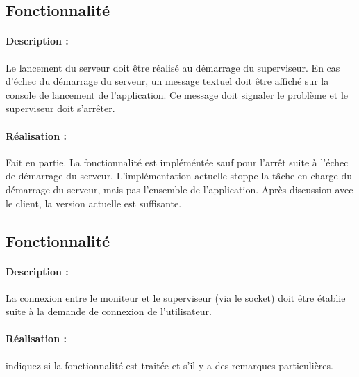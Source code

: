 \documentclass[11pt, a4paper]{paper}
\newcounter{cptreq}
\begin{document}
{\color{gray}
\subsection{Fonctionnalité \thecptreq *}

\paragraph{Description :} Le lancement du serveur doit être réalisé au démarrage du superviseur. En cas d'échec du démarrage du serveur, un message textuel doit être  affiché sur la console de lancement de l'application. Ce message doit signaler le problème et le superviseur doit s'arrêter.

\paragraph{\color{black}Réalisation :}  {\color{blue} Fait en partie. La fonctionnalité est impléméntée sauf pour l'arrêt suite à l'échec de démarrage du serveur. L'implémentation actuelle stoppe la tâche en charge du démarrage du serveur, mais pas l'ensemble de l'application. Après discussion avec le client, la version actuelle est suffisante.}
}
{\color{gray}
\subsection{Fonctionnalité \thecptreq *}

\paragraph{Description :} La connexion entre le moniteur et le superviseur (via le socket) doit être établie suite à la demande de connexion de l'utilisateur.

\paragraph{\color{black}Réalisation :}  {\color{red} indiquez si la fonctionnalité est traitée et s'il y a des remarques particulières.}
}
\end{document}
